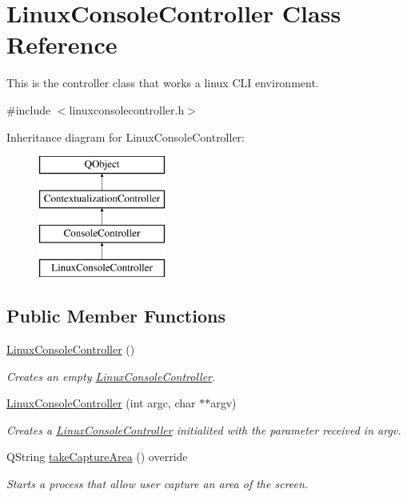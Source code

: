 \hypertarget{classLinuxConsoleController}{}\section{Linux\+Console\+Controller Class Reference}
\label{classLinuxConsoleController}


This is the controller class that works a linux C\+LI environment.  




{\ttfamily \#include $<$linuxconsolecontroller.\+h$>$}

Inheritance diagram for Linux\+Console\+Controller\+:\begin{figure}[H]
\begin{center}
\leavevmode
\includegraphics[height=4.000000cm]{classLinuxConsoleController}
\end{center}
\end{figure}
\subsection*{Public Member Functions}
\begin{DoxyCompactItemize}
\item 
\mbox{\label{classLinuxConsoleController_a22dbaf4b36c07b2bc729287c93118853}} 
\mbox{\hyperlink{classLinuxConsoleController_a22dbaf4b36c07b2bc729287c93118853}{Linux\+Console\+Controller}} ()
\begin{DoxyCompactList}\small\item\em Creates an empty \mbox{\hyperlink{classLinuxConsoleController}{Linux\+Console\+Controller}}. \end{DoxyCompactList}\item 
\mbox{\hyperlink{classLinuxConsoleController_a28e3374d97058fa2649d2582686bfe6f}{Linux\+Console\+Controller}} (int argc, char $\ast$$\ast$argv)
\begin{DoxyCompactList}\small\item\em Creates a \mbox{\hyperlink{classLinuxConsoleController}{Linux\+Console\+Controller}} initialited with the parameter received in argv. \end{DoxyCompactList}\item 
Q\+String \mbox{\hyperlink{classLinuxConsoleController_ac9944bf1302b077c733802349359e777}{take\+Capture\+Area}} () override
\begin{DoxyCompactList}\small\item\em Starts a process that allow user capture an area of the screen. \end{DoxyCompactList}\end{DoxyCompactItemize}

